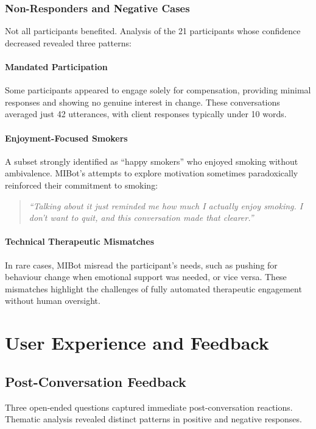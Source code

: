 \subsubsection{Non-Responders and Negative Cases}

Not all participants benefited. Analysis of the 21 participants whose confidence decreased revealed three patterns:

\paragraph{Mandated Participation}
Some participants appeared to engage solely for compensation, providing minimal responses and showing no genuine interest in change. These conversations averaged just 42 utterances, with client responses typically under 10 words.

\paragraph{Enjoyment-Focused Smokers}
A subset strongly identified as ``happy smokers'' who enjoyed smoking without ambivalence. MIBot's attempts to explore motivation sometimes paradoxically reinforced their commitment to smoking:

\begin{quote}
\textit{``Talking about it just reminded me how much I actually enjoy smoking. I don't want to quit, and this conversation made that clearer.''}
\end{quote}

\paragraph{Technical Therapeutic Mismatches}
In rare cases, MIBot misread the participant's needs, such as pushing for behaviour change when emotional support was needed, or vice versa. These mismatches highlight the challenges of fully automated therapeutic engagement without human oversight.

\section{User Experience and Feedback}
\label{sec:feedback}

\subsection*{Post-Conversation Feedback}

Three open-ended questions captured immediate post-conversation reactions. Thematic analysis revealed distinct patterns in positive and negative responses.

